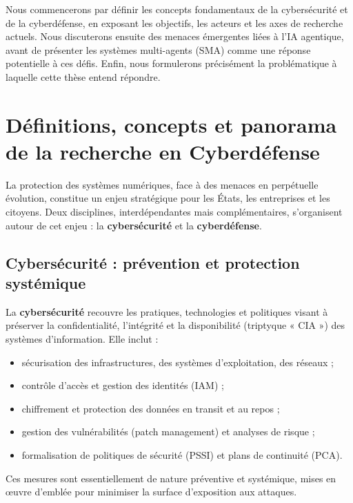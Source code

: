 \documentclass[ twoside,openright,titlepage,numbers=noenddot,headinclude,%
                footinclude=true,cleardoublepage=empty,abstractoff, %
                BCOR=5mm,paper=a4,fontsize=11pt,%
                french,american,%
                ]{scrreprt}
\begin{document}
Nous commencerons par définir les concepts fondamentaux de la cybersécurité et de la cyberdéfense, en exposant les objectifs, les acteurs et les axes de recherche actuels. Nous discuterons ensuite des menaces émergentes liées à l'IA agentique, avant de présenter les systèmes multi-agents (SMA) comme une réponse potentielle à ces défis. Enfin, nous formulerons précisément la problématique à laquelle cette thèse entend répondre.

\section{Définitions, concepts et panorama de la recherche en Cyberdéfense}\label{sec:cyberdef-panorama}


La protection des systèmes numériques, face à des menaces en perpétuelle évolution, constitue un enjeu stratégique pour les États, les entreprises et les citoyens. Deux disciplines, interdépendantes mais complémentaires, s'organisent autour de cet enjeu : la \textbf{cybersécurité} et la \textbf{cyberdéfense}.

\subsection*{Cybersécurité : prévention et protection systémique}

La \textbf{cybersécurité} recouvre les pratiques, technologies et politiques visant à préserver la confidentialité, l'intégrité et la disponibilité (triptyque « CIA ») des systèmes d'information. Elle inclut :
\begin{itemize}
  \item sécurisation des infrastructures, des systèmes d'exploitation, des réseaux ;
  \item contrôle d'accès et gestion des identités (IAM) ;
  \item chiffrement et protection des données en transit et au repos ;
  \item gestion des vulnérabilités (patch management) et analyses de risque ;
  \item formalisation de politiques de sécurité (PSSI) et plans de continuité (PCA).
\end{itemize}
Ces mesures sont essentiellement de nature préventive et systémique, mises en œuvre d'emblée pour minimiser la surface d'exposition aux attaques.
\end{document}
